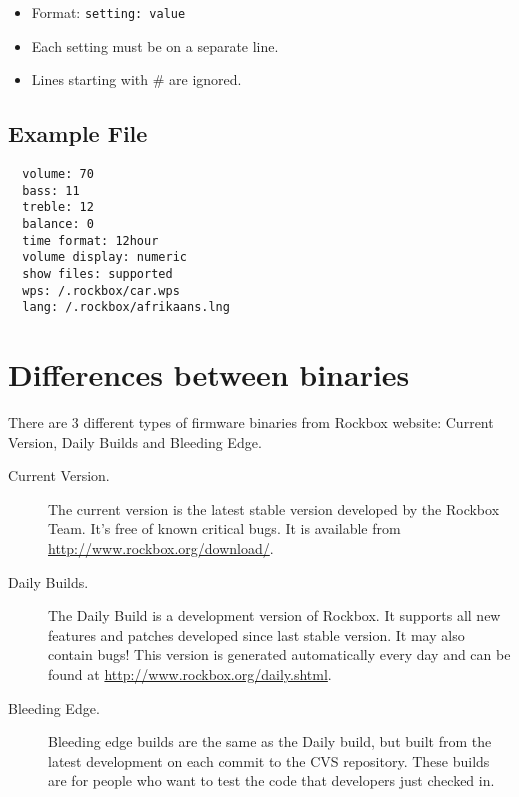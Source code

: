\begin{itemize}
\item Format: \verb+setting: value+
\item Each setting must be on a separate line.
\item Lines starting with \# are ignored.
\end{itemize}

\subsection{Example File}
\begin{verbatim}
  volume: 70
  bass: 11
  treble: 12
  balance: 0
  time format: 12hour
  volume display: numeric
  show files: supported
  wps: /.rockbox/car.wps
  lang: /.rockbox/afrikaans.lng
\end{verbatim}

\section{\label{ref:PartISection1}Differences between binaries}
There are 3 different types of firmware binaries from Rockbox website: 
Current Version, Daily Builds and Bleeding Edge.

\begin{description}
\item[Current Version.] The current version is the latest stable version
developed by the Rockbox Team. It's free of known critical bugs.  It is
available from \url{http://www.rockbox.org/download/}.
\item[Daily Builds.] The Daily Build is a development version of Rockbox. It
supports all new features and patches developed since last stable version. It
may also contain bugs! This version is generated automatically every day 
and can be found at \url{http://www.rockbox.org/daily.shtml}.
\item[Bleeding Edge.] Bleeding edge builds are the same as the Daily build, 
but built from the latest development on each commit to the CVS repository.
These builds are for people who want to test the code that developers just
checked in.
\end{description}


